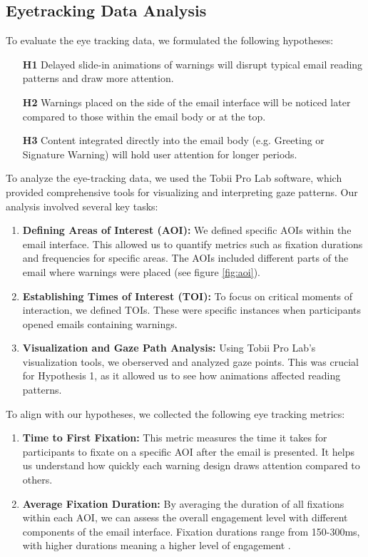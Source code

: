 \documentclass[
  a4paper,  %
  twoside,  %
  bibliography=totoc,
  headsepline,
  cleardoublepage=empty,
  parskip=half,
  draft=false
]{scrbook}
\begin{document}
\subsection{Eyetracking Data Analysis}
To evaluate the eye tracking data, we formulated the following hypotheses:

\begin{itemize}
    \item[\textbf{H1}] Delayed slide-in animations of warnings will disrupt typical email reading patterns and draw more attention.
    \item[\textbf{H2}] Warnings placed on the side of the email interface will be noticed later compared to those within the email body or at the top.
    \item[\textbf{H3}] Content integrated directly into the email body (e.g. Greeting or Signature Warning) will hold user attention for longer periods.
\end{itemize}

To analyze the eye-tracking data, we used the Tobii Pro Lab software, which provided comprehensive tools for visualizing and interpreting gaze patterns. Our analysis involved several key tasks:

\begin{enumerate}
    \item \textbf{Defining Areas of Interest (AOI):} We defined specific AOIs within the email interface. This allowed us to quantify metrics such as fixation durations and frequencies for specific areas. The AOIs included different parts of the email where warnings were placed (see figure \ref{fig:aoi}).
    \item \textbf{Establishing Times of Interest (TOI):} To focus on critical moments of interaction, we defined TOIs. These were specific instances when participants opened emails containing warnings.
    \item \textbf{Visualization and Gaze Path Analysis:} Using Tobii Pro Lab’s visualization tools, we oberserved and analyzed gaze points. This was crucial for Hypothesis 1, as it allowed us to see how animations affected reading patterns.
\end{enumerate}

To align with our hypotheses, we collected the following eye tracking metrics:

\begin{enumerate}
    \item \textbf{Time to First Fixation:} This metric measures the time it takes for participants to fixate on a specific AOI after the email is presented. It helps us understand how quickly each warning design draws attention compared to others.
    \item \textbf{Average Fixation Duration:} By averaging the duration of all fixations within each AOI, we can assess the overall engagement level with different components of the email interface. Fixation durations range from 150-300ms, with higher durations meaning a higher level of engagement \cite{eyetrack}.
\end{enumerate}
\end{document}
